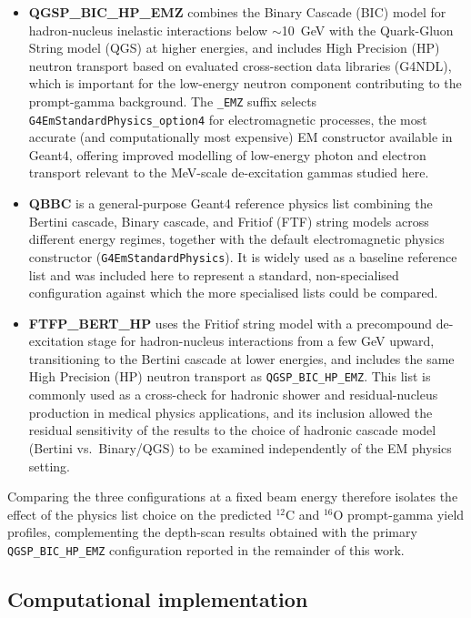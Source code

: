 \documentclass[a4paper]{article}
\begin{document}
\begin{itemize}
    \item \textbf{QGSP\_BIC\_HP\_EMZ} combines the Binary Cascade (BIC) model for hadron-nucleus inelastic interactions below $\sim$10~GeV with the Quark-Gluon String model (QGS) at higher energies, and includes High Precision (HP) neutron transport based on evaluated cross-section data libraries (G4NDL), which is important for the low-energy neutron component contributing to the prompt-gamma background. The \texttt{\_EMZ} suffix selects \texttt{G4EmStandardPhysics\_option4} for electromagnetic processes, the most accurate (and computationally most expensive) EM constructor available in Geant4, offering improved modelling of low-energy photon and electron transport relevant to the MeV-scale de-excitation gammas studied here.
    \item \textbf{QBBC} is a general-purpose Geant4 reference physics list combining the Bertini cascade, Binary cascade, and Fritiof (FTF) string models across different energy regimes, together with the default electromagnetic physics constructor (\texttt{G4EmStandardPhysics}). It is widely used as a baseline reference list and was included here to represent a standard, non-specialised configuration against which the more specialised lists could be compared.
    \item \textbf{FTFP\_BERT\_HP} uses the Fritiof string model with a precompound de-excitation stage for hadron-nucleus interactions from a few GeV upward, transitioning to the Bertini cascade at lower energies, and includes the same High Precision (HP) neutron transport as \texttt{QGSP\_BIC\_HP\_EMZ}. This list is commonly used as a cross-check for hadronic shower and residual-nucleus production in medical physics applications, and its inclusion allowed the residual sensitivity of the results to the choice of hadronic cascade model (Bertini vs.\ Binary/QGS) to be examined independently of the EM physics setting.
\end{itemize}

Comparing the three configurations at a fixed beam energy therefore isolates the effect of the physics list choice on the predicted $^{12}$C and $^{16}$O prompt-gamma yield profiles, complementing the depth-scan results obtained with the primary \texttt{QGSP\_BIC\_HP\_EMZ} configuration reported in the remainder of this work.

\subsection{Computational implementation}
\end{document}
